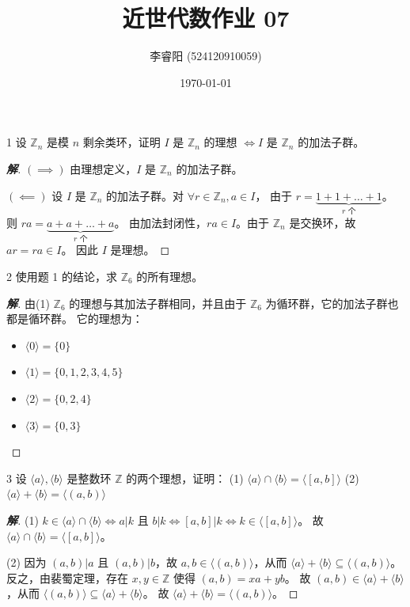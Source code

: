 \documentclass[12pt, a4paper]{article}
\title{近世代数作业 07}
\author{李睿阳 (524120910059)}
\date{\today}
\newenvironment{solution}{
    \begin{proof}[\textbf{解}]
}{
    \end{proof}
}
\begin{document}
\maketitle


\begin{problem}{1}
    设 $\mathbb{Z}_n$ 是模 $n$ 剩余类环，证明 $I$ 是 $\mathbb{Z}_n$ 的理想 $\iff I$ 是 $\mathbb{Z}_n$ 的加法子群。
\end{problem}
\begin{solution}
    $(\implies)$ 由理想定义，$I$ 是 $\mathbb{Z}_n$ 的加法子群。

    $(\impliedby)$ 设 $I$ 是 $\mathbb{Z}_n$ 的加法子群。对 $\forall r \in \mathbb{Z}_n, a \in I$，
    由于 $r = \underbrace{1 + 1 + \dots + 1}_{r \text{ 个}}$。
    则 $ra = \underbrace{a + a + \dots + a}_{r \text{ 个}}$。
    由加法封闭性，$ra \in I$。由于 $\mathbb{Z}_n$ 是交换环，故 $ar = ra \in I$。
    因此 $I$ 是理想。
\end{solution}


\begin{problem}{2}
    使用题 1 的结论，求 $\mathbb{Z}_6$ 的所有理想。
\end{problem}
\begin{solution}
    由(1) $\mathbb{Z}_6$ 的理想与其加法子群相同，并且由于 $\mathbb{Z}_6$ 为循环群，它的加法子群也都是循环群。
    它的理想为：
    \begin{itemize}
        \item $\langle 0 \rangle = \{0\}$
        \item $\langle 1 \rangle = \{0, 1, 2, 3, 4, 5\}$
        \item $\langle 2 \rangle = \{0, 2, 4\}$
        \item $\langle 3 \rangle = \{0, 3\}$
    \end{itemize}
\end{solution}


\begin{problem}{3}
    设 $\langle a \rangle, \langle b \rangle$ 是整数环 $\mathbb{Z}$ 的两个理想，证明：
    (1) $\langle a \rangle \cap \langle b \rangle = \langle [a, b] \rangle$
    (2) $\langle a \rangle + \langle b \rangle = \langle (a, b) \rangle$
\end{problem}
\begin{solution}
    (1) $k \in \langle a \rangle \cap \langle b \rangle \iff a|k$ 且 $b|k \iff [a, b] | k \iff k \in \langle [a, b] \rangle$。
    故 $\langle a \rangle \cap \langle b \rangle = \langle [a, b] \rangle$。

    (2) 因为 $(a, b) | a$ 且 $(a, b) | b$，故 $a, b \in \langle (a, b) \rangle$，从而 $\langle a \rangle + \langle b \rangle \subseteq \langle (a, b) \rangle$。
    反之，由裴蜀定理，存在 $x, y \in \mathbb{Z}$ 使得 $(a, b) = xa + yb$。
    故 $(a, b) \in \langle a \rangle + \langle b \rangle$，从而 $\langle (a, b) \rangle \subseteq \langle a \rangle + \langle b \rangle$。
    故 $\langle a \rangle + \langle b \rangle = \langle (a, b) \rangle$。
\end{solution}
    
\end{document}
